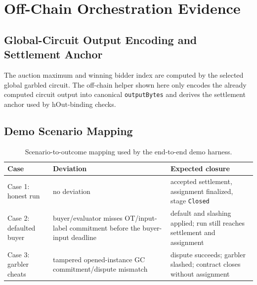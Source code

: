 \documentclass[final,twoside]{vutinfth}
\begin{document}
\chapter{Off-Chain Orchestration Evidence}
\label{app:orchestration}
\section{Global-Circuit Output Encoding and Settlement Anchor}
\label{app:d1}
The auction maximum and winning bidder index are computed by the selected
global garbled circuit. The off-chain helper shown here only encodes the
already computed circuit output into canonical \texttt{outputBytes} and derives
the settlement anchor used by \(\mathrm{hOut}\)-binding checks.


\section{Demo Scenario Mapping}
\label{app:d2}
\begin{table}[htbp]
\centering
\begin{tabular}{|p{}|p{}|p{}|}
\hline
\textbf{Case} & \textbf{Deviation} & \textbf{Expected closure} \\ \hline
Case 1: honest run & no deviation & accepted settlement, assignment finalized, stage \texttt{Closed} \\ \hline
Case 2: defaulted buyer & buyer/evaluator misses OT/input-label commitment before the buyer-input deadline & default and slashing applied; run still reaches settlement and assignment \\ \hline
Case 3: garbler cheats & tampered opened-instance GC commitment/dispute mismatch & dispute succeeds; garbler slashed; contract closes without assignment \\ \hline
\end{tabular}
\caption{Scenario-to-outcome mapping used by the end-to-end demo harness.}
\label{tab:appendix-demo-cases}
\end{table}

\backmatter
\end{document}
